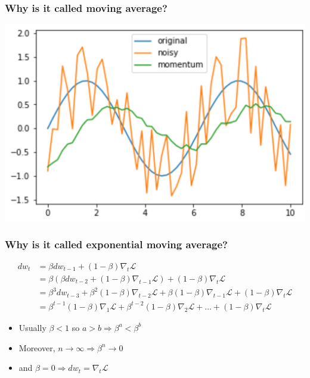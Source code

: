 \documentclass{beamer}
\begin{document}
\begin{frame}
    \frametitle{Why is it called moving average?}
    \begin{center}
        \includegraphics[width=\textwidth]{figs/momentum.png}
    \end{center}
    

\end{frame}

\begin{frame}
    \frametitle{Why is it called exponential moving average?}
\begin{align*}
    dw_t&=\beta dw_{t-1}+(1-\beta)\nabla_t\mathcal{L}\\
    &=\beta (\beta dw_{t-2}+(1-\beta)\nabla_{t-1}\mathcal{L})+(1-\beta)\nabla_t\mathcal{L}\\
    &=\beta^3dw_{t-3}+\beta^2(1-\beta)\nabla_{t-2}\mathcal{L}+\beta(1-\beta)\nabla_{t-1}\mathcal{L}+(1-\beta)\nabla_t\mathcal{L}\\
    &=\beta^{t-1}(1-\beta)\nabla_1\mathcal{L}+\beta^{t-2}(1-\beta)\nabla_2\mathcal{L}+\ldots+(1-\beta)\nabla_t\mathcal{L}
\end{align*}
    \begin{itemize}
        \item Usually $\beta<1$ so $a>b\Rightarrow \beta^a<\beta^b$
        \item Moreover, $n\rightarrow \infty\Rightarrow \beta^n\rightarrow 0$
        \item and $\beta=0\Rightarrow dw_t=\nabla_t\mathcal{L}$
    \end{itemize}

\end{frame}
\end{document}
